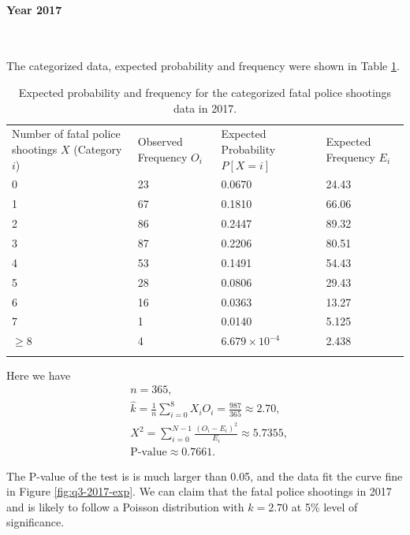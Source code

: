 \documentclass[conf]{new-aiaa}
\begin{document}
\paragraph{Year 2017}\ 

The categorized data, expected probability and frequency were shown in Table \ref{tab:q3-2017-exp}. \medskip

\begin{table}[!htbp]
\centering
\begin{tabular}{m{3cm}<{\centering}m{3cm}<{\centering}m{3cm}<{\centering}m{3cm}<{\centering}}
\toprule 
\toprule
Number of fatal police shootings $X$ (Category $i$)
 & Observed Frequency $O_i$ 
& Expected Probability $P[X=i]$ & Expected Frequency $E_i$ \\
\noalign{\smallskip}\hline\noalign{\smallskip}
0  &   23   & 0.0670   & 24.43\\
1  &   67   & 0.1810   & 66.06\\
2  &   86   & 0.2447   & 89.32\\
3  &   87   & 0.2206   & 80.51\\
4  &   53   & 0.1491   & 54.43\\
5  &   28   & 0.0806   & 29.43\\
6  &   16   & 0.0363   & 13.27\\
7  &   1    & 0.0140   & 5.125\\
$\geqslant$8  &   4    & $6.679\times10^{-4}$  & 2.438\\
\bottomrule 
\bottomrule  \smallskip
\end{tabular}
\caption{Expected probability and frequency for the categorized fatal police shootings data in 2017.}
\label{tab:q3-2017-exp}
\end{table}

Here we have
\begin{align*}
&n=365,\\
&\hat{k} = \frac{1}{n}\sum_{i=0}^{8} X_iO_i = \frac{987}{365} \approx 2.70,\\
&X^2=\sum_{i=0}^{N-1}\frac{(O_i-E_i)^2}{E_i}\approx5.7355,\\
&\text{P-value}\approx0.7661.
\end{align*}

The P-value of the test is is much larger than 0.05, and the data fit the curve fine in Figure \ref{fig:q3-2017-exp}. We can claim that the fatal police shootings in 2017 and is likely to follow a Poisson distribution with $k=2.70$ at 5\% level of significance.
\end{document}
